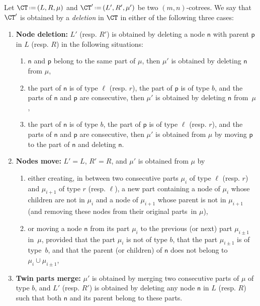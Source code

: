 \documentclass[AHL,Unicode,longabstracts,published]{cedram}
\newcommand{\eqdef}{\mbox{\,\raisebox{0.2ex}{\scriptsize\ensuremath{\mathrm:}}\ensuremath{=}\,}}
\newcommand{\node}[1]{\mathsf{#1}}
\newcommand*{\romanenumi}{\renewcommand*{\theenumi}{\roman{enumi}}}
\newcommand*{\alphenumi}{\renewcommand*{\theenumi}{\alph{enumi}}}
\begin{document}
\begin{defi}\label{def:cotreeDeletion}
Let $\CT \eqdef (L, R, \mu)$ and $\CT' \eqdef (L', R', \mu')$ be two $(m,n)$-cotrees. We say that $\CT'$ is obtained by a
\emph{deletion} in $\CT$ in either of the following three cases:
\begin{enumerate}\romanenumi
\item\label{defi4.2.1} \textbf{Node deletion:} $L'$ (resp. $R'$) is obtained by deleting a node $\node{n}$ with parent $\node{p}$ in $L$ (resp. $R$) in the following situations:
\begin{enumerate}\alphenumi
\item\label{defi4.2.1.a} $\node{n}$ and $\node{p}$ belong to the same part of $\mu$, then $\mu'$ is obtained by deleting $\node{n}$ from $\mu$,
\item\label{defi4.2.1.b} the part of $\node{n}$ is of type $\ell$ (resp. $r$), the part of $\node{p}$ is of type $b$, and the parts of $\node{n}$ and $\node{p}$ are consecutive, then $\mu'$ is obtained by deleting $\node{n}$ from~$\mu$,
\item\label{defi4.2.1.c} the part of $\node{n}$ is of type $b$, the part of $\node{p}$ is of type $\ell$ (resp. $r$), and the parts of $\node{n}$ and $\node{p}$ are consecutive, then $\mu'$ is obtained from $\mu$ by moving $\node{p}$ to the part of $\node{n}$ and deleting $\node{n}$.
\end{enumerate}
\item\label{defi4.2.2} \textbf{Nodes move:} $L' = L$, $R' = R$, and $\mu'$ is obtained from $\mu$ by
\begin{enumerate}\alphenumi
\item \label{defi4.2.2.a}either creating, in between two consecutive parts $\mu_i$ of type $\ell$ (resp. $r$) and $\mu_{i+1}$ of type $r$ (resp. $\ell$), a new part containing a node of $\mu_i$ whose children are not in $\mu_i$ and a node of $\mu_{i+1}$ whose parent is not in $\mu_{i+1}$ (and removing these nodes from their original parts~in $\mu$),
\item \label{defi4.2.2.b}or moving a node $\node{n}$ from its part $\mu_i$ to the previous (or next) part $\mu_{i \pm 1}$ in~$\mu$, provided that the part $\mu_i$ is not of type $b$, that the part $\mu_{i \pm 1}$ is of type~$b$, and that the parent (or children) of $\node{n}$ does not belong to $\mu_i \cup \mu_{i \pm 1}$,
\end{enumerate}
\item\label{defi4.2.3}\textbf{Twin parts merge:} $\mu'$ is obtained by merging two consecutive parts of $\mu$ of type $b$, and $L'$ (resp. $R'$) is obtained by deleting any node $\node{n}$ in $L$ (resp. $R$) such that both $\node{n}$ and its parent belong to these parts.
\end{enumerate}
\end{defi}
\end{document}
